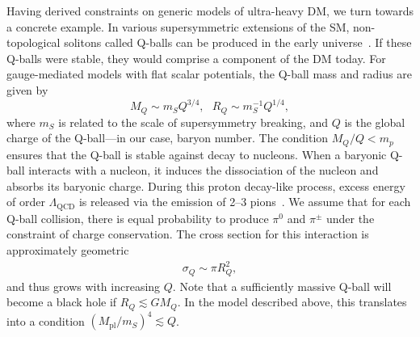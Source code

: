 Having derived constraints on generic models of ultra-heavy DM, we turn towards a concrete example.
In various supersymmetric extensions of the SM, non-topological solitons called Q-balls can be produced in the early universe~\cite{Coleman:1985ki, Kusenko:1997si}.
If these Q-balls were stable, they would comprise a component of the DM today.
For gauge-mediated models with flat scalar potentials, the Q-ball mass and radius are given by
\begin{equation}
\label{eq:Qballprop}
M_Q \sim m_S Q^{3/4}, ~~~ R_Q \sim m_S^{-1} Q^{1/4},
\end{equation}
where $m_S$ is related to the scale of supersymmetry breaking, and $Q$ is the global charge of the Q-ball---in our case, baryon number.
The condition $M_Q/Q < m_p$ ensures that the Q-ball is stable against decay to nucleons.
When a baryonic Q-ball interacts with a nucleon, it induces the dissociation of the nucleon and absorbs its baryonic charge.
During this proton decay-like process, excess energy of order $\Lambda_\text{QCD}$ is released via the emission of 2--3 pions~\cite{Kusenko:1998}.
We assume that for each Q-ball collision, there is equal probability to produce $\pi^0$ and $\pi^\pm$ under the constraint of charge conservation.
The cross section for this interaction is approximately geometric
\begin{align}
\sigma_Q \sim \pi R_Q^2,
\end{align}
and thus grows with increasing $Q$.
Note that a sufficiently massive Q-ball will become a black hole if $R_Q \lesssim G M_Q$.
In the model described above, this translates into a condition $(M_\text{pl}/m_S)^4 \lesssim Q$.


